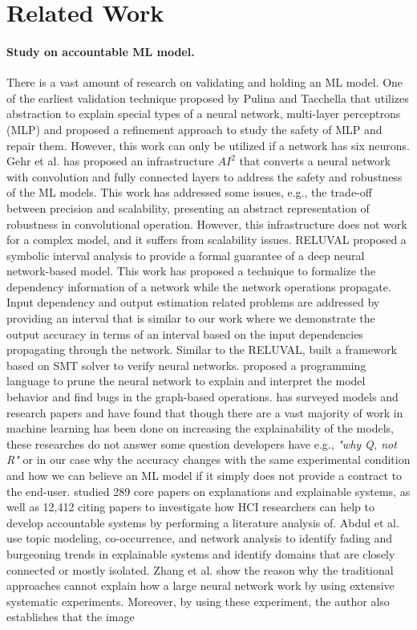 \section{Related Work}
\label{sec:relatedwork}
\paragraph{\textbf{Study on accountable ML model.}}
There is a vast amount of research on validating and holding an ML model. One of the earliest validation technique proposed by Pulina and Tacchella \cite{pulina2010abstraction} that utilizes abstraction to explain special types of a neural network, multi-layer perceptrons (MLP) and proposed a refinement approach to study the safety of MLP and repair them. However, this work can only be utilized if a network has six neurons. Gehr et al. \cite{gehr2018ai2} has proposed an infrastructure $AI^{2}$ that converts a neural network with convolution and fully connected layers to address the safety and robustness of the ML models. This work has addressed some issues, e.g., the trade-off between precision and scalability, presenting an abstract representation of robustness in convolutional operation. However, this infrastructure does not work for a complex model, and it suffers from scalability issues. RELUVAL \cite{wang2018formal} proposed a symbolic interval analysis to provide a formal guarantee of a deep neural network-based model. This work has proposed a technique to formalize the dependency information of a network while the network operations propagate. Input dependency and output estimation related problems are addressed by providing an interval that is similar to our work where we demonstrate the output accuracy in terms of an interval based on the input dependencies propagating through the network. Similar to the RELUVAL, \cite{katz2017reluplex} built a framework based on SMT solver to verify neural networks. \cite{jia2019taso} proposed a programming language to prune the neural network to explain and interpret the model behavior and find bugs in the graph-based operations. \cite{du2018techniques} has surveyed models and research papers and have found that though there are a vast majority of work in machine learning has been done on increasing the explainability of the models, these researches do not answer some question developers have e.g., \emph{"why Q, not R"} or in our case why the accuracy changes with the same experimental condition and how we can believe an ML model if it simply does not provide a contract to the end-user. \cite{abdul2018trends} studied 289 core papers on explanations and explainable systems, as well as 12,412 citing papers to investigate how HCI researchers can help to develop accountable systems by performing a literature analysis of. Abdul et al. use topic modeling, co-occurrence, and network analysis to identify fading and burgeoning trends in explainable systems and identify domains that are closely connected or mostly isolated. Zhang et al. \cite{zhang2016understanding} show the reason why the traditional approaches cannot explain how a large neural network work by using extensive systematic experiments. Moreover, by using these experiment, the author also establishes that the image 